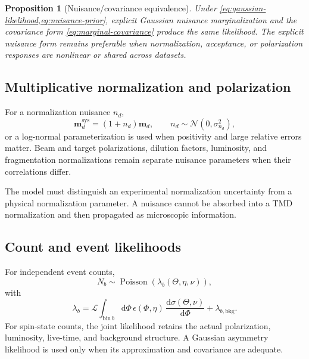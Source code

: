\documentclass[11pt]{article}
\newtheorem{proposition}[definition]{Proposition}
\newcommand{\dd}{\mathrm{d}}
\newcommand{\sys}{\mathrm{sys}}
\begin{document}
\begin{proposition}[Nuisance/covariance equivalence]
Under \cref{eq:gaussian-likelihood,eq:nuisance-prior}, explicit Gaussian
nuisance marginalization and the covariance form
\cref{eq:marginal-covariance} produce the same likelihood.  The explicit
nuisance form remains preferable when normalization, acceptance, or
polarization responses are nonlinear or shared across datasets.
\end{proposition}

\subsection{Multiplicative normalization and polarization}

For a normalization nuisance \(n_d\),
\begin{equation}
 \bm m_d^{\sys}
 =
 \left(1+n_d\right)\bm m_d,
 \qquad
 n_d\sim\mathcal N(0,\sigma_{n_d}^2),
 \label{eq:multiplicative-normalization}
\end{equation}
or a log-normal parameterization is used when positivity and large relative
errors matter.  Beam and target polarizations, dilution factors, luminosity,
and fragmentation normalizations remain separate nuisance parameters when
their correlations differ.

The model must distinguish an experimental normalization uncertainty from a
physical normalization parameter.  A nuisance cannot be absorbed into a TMD
normalization and then propagated as microscopic information.

\subsection{Count and event likelihoods}

For independent event counts,
\begin{equation}
 N_b\sim\operatorname{Poisson}\!\left(\lambda_b(\Theta,\eta,\nu)\right),
 \label{eq:poisson-likelihood}
\end{equation}
with
\begin{equation}
 \lambda_b
 =
 \mathcal L
 \int_{\mathrm{bin}\ b}
 \dd\Phi\,
 \epsilon(\Phi,\eta)\,
 \frac{\dd\sigma(\Theta,\nu)}{\dd\Phi}
 +\lambda_{b,\mathrm{bkg}} .
 \label{eq:expected-count}
\end{equation}
For spin-state counts, the joint likelihood retains the actual polarization,
luminosity, live-time, and background structure.  A Gaussian asymmetry
likelihood is used only when its approximation and covariance are adequate.
\end{document}
